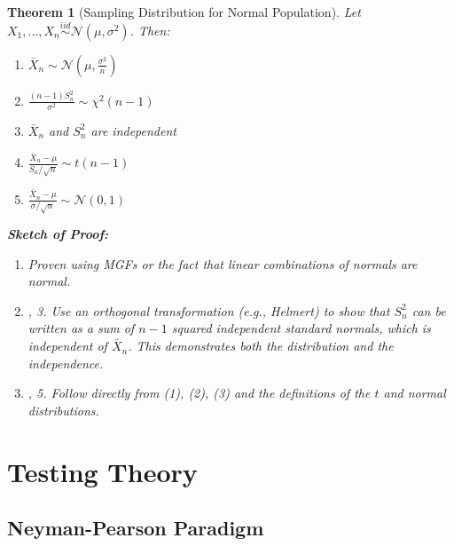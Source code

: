 \documentclass[12pt,a4paper]{article}
\newtheorem{theorem}{Theorem}[section]
\theoremstyle{remark}
\begin{document}
\begin{theorem}[Sampling Distribution for Normal Population]
Let $X_1, \ldots, X_n \stackrel{iid}{\sim} \mathcal{N}(\mu, \sigma^2)$. Then:
\begin{enumerate}
\item $\bar{X}_n \sim \mathcal{N}\left(\mu, \frac{\sigma^2}{n}\right)$
\item $\frac{(n-1)S_n^2}{\sigma^2} \sim \chi^2(n-1)$
\item $\bar{X}_n$ and $S_n^2$ are independent
\item $\frac{\bar{X}_n - \mu}{S_n/\sqrt{n}} \sim t(n-1)$
\item $\frac{\bar{X}_n - \mu}{\sigma/\sqrt{n}} \sim \mathcal{N}(0,1)$
\end{enumerate}

\textbf{Sketch of Proof:}
\begin{enumerate}
\item Proven using MGFs or the fact that linear combinations of normals are normal.
\item, 3. Use an orthogonal transformation (e.g., Helmert) to show that $S_n^2$ can be written as a sum of $n-1$ squared independent standard normals, which is independent of $\bar{X}_n$. This demonstrates both the distribution and the independence.
\item, 5. Follow directly from (1), (2), (3) and the definitions of the $t$ and normal distributions.
\end{enumerate}
\end{theorem}

\section{Testing Theory}

\subsection{Neyman-Pearson Paradigm}
\end{document}
